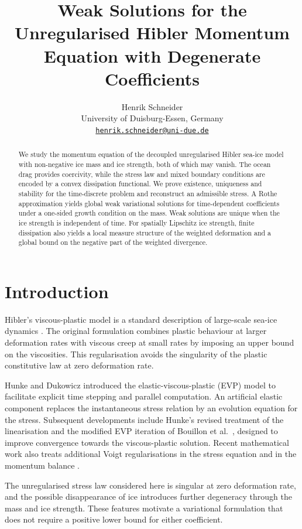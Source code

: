 \documentclass{article}
\author{Henrik Schneider\\[0.4em]
\small University of Duisburg-Essen, Germany\\
\small\href{mailto:henrik.schneider@uni-due.de}{\texttt{henrik.schneider@uni-due.de}}}
\title{Weak Solutions for the Unregularised Hibler Momentum Equation with Degenerate Coefficients}
\theoremstyle{definition}
\begin{document}
\maketitle
\begin{abstract}
We study the momentum equation of the decoupled unregularised Hibler sea-ice
model with non-negative ice mass and ice strength, both of which may vanish.
The ocean drag provides coercivity, while the stress law and mixed boundary
conditions are encoded by a convex dissipation functional. We prove existence,
uniqueness and stability for the time-discrete problem and reconstruct an
admissible stress. A Rothe approximation yields global weak variational
solutions for time-dependent coefficients under a one-sided growth condition
on the mass. Weak solutions are unique when the ice strength is
independent of time.
For spatially Lipschitz ice strength, finite dissipation also yields a local
measure structure of the weighted deformation and a global bound on the
negative part of the weighted divergence.
\end{abstract}
\section{Introduction}
Hibler's viscous-plastic model is a standard description of large-scale sea-ice
dynamics \cite{H79}. The original formulation combines plastic behaviour at
larger deformation rates with viscous creep at small rates by imposing an
upper bound on the viscosities. This regularisation avoids the singularity
of the plastic constitutive law at zero deformation rate.

Hunke and Dukowicz \cite{HD97} introduced the elastic-viscous-plastic (EVP)
model to facilitate explicit time stepping and parallel computation. An
artificial elastic component replaces the instantaneous stress relation by
an evolution equation for the stress. Subsequent developments include
Hunke's revised treatment of the linearisation \cite{H01} and the modified
EVP iteration of Bouillon et al.\ \cite{BFLM13}, designed to improve
convergence towards the viscous-plastic solution. Recent mathematical work
also treats additional Voigt regularisations in the stress equation
\cite{BLTT26a} and in the momentum balance \cite{BLTT26b}.

The unregularised stress law considered here is singular at zero deformation
rate, and the possible disappearance of ice introduces further degeneracy
through the mass and ice strength. These features motivate a variational
formulation that does not require a positive lower bound for either
coefficient.
\end{document}
